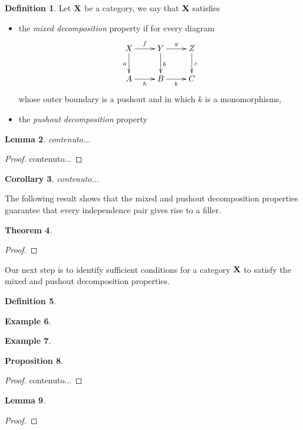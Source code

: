 \documentclass[a4paper]{article}
\def\X{\textbf {\textup{X}}}
\newtheorem{theorem}{Theorem}[section]
\newtheorem{proposition}[theorem]{Proposition}
\newtheorem{lemma}[theorem]{Lemma}
\newtheorem{corollary}[theorem]{Corollary}
\theoremstyle{definition}
\newtheorem{definition}[theorem]{Definition}
\newtheorem{example}[theorem]{Example}
\begin{document}
\begin{definition}Let $\X$ be a category, we say that $\X$ satisfies
	\begin{itemize}
		\item the \emph{mixed decomposition} property if for every diagram
		\[\xymatrix{X \ar[d]_{a} \ar[r]^{f}& \ar[r]^{g} Y \ar[d]^{b}& Z \ar[d]^{c}\\ A \ar[r]_{h}& B \ar[r]_{k}& C}\]
		whose outer boundary is a pushout and in which $k$ is a monomorphisms, 
		\item the \emph{pushout decomposition} property
	\end{itemize}
\end{definition}

\begin{lemma}
	contenuto...
\end{lemma}
\begin{proof}
	contenuto...\qedhere 
\end{proof}

\begin{corollary}
	contenuto...
\end{corollary}

The following result shows that the mixed and pushout decomposition properties guarantee that every independence pair gives rise to a filler.

\begin{theorem}
\end{theorem}
\begin{proof}\qedhere 
\end{proof}

Our next step is to identify sufficient conditions for a category $\X$ to satisfy the mixed and pushout decomposition properties.

\begin{definition}
\end{definition}

\begin{example}
\end{example}

\begin{example}
\end{example}

\begin{proposition}
\end{proposition}
\begin{proof}
	contenuto... \qedhere 
\end{proof}
\begin{lemma}
\end{lemma}
\begin{proof}
	\qedhere 
\end{proof}
\end{document}
